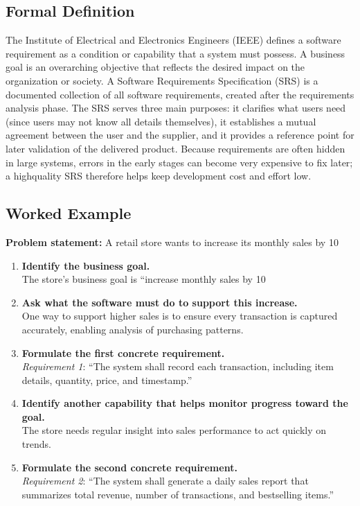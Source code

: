 \documentclass[12pt, a4paper]{article}
\begin{document}
\subsection{Formal Definition}
The Institute of Electrical and Electronics Engineers (IEEE) defines a software requirement as a condition or capability that a system must possess. A business goal is an overarching objective that reflects the desired impact on the organization or society. A Software Requirements Specification (SRS) is a documented collection of all software requirements, created after the requirements analysis phase. The SRS serves three main purposes: it clarifies what users need (since users may not know all details themselves), it establishes a mutual agreement between the user and the supplier, and it provides a reference point for later validation of the delivered product. Because requirements are often hidden in large systems, errors in the early stages can become very expensive to fix later; a highquality SRS therefore helps keep development cost and effort low.

\subsection{Worked Example}
\textbf{Problem statement:} A retail store wants to increase its monthly sales by 10 %

\begin{enumerate}
    \item \textbf{Identify the business goal.}\\
    The store's business goal is ``increase monthly sales by 10 %
    \item \textbf{Ask what the software must do to support this increase.}\\
    One way to support higher sales is to ensure every transaction is captured accurately, enabling analysis of purchasing patterns.
    \item \textbf{Formulate the first concrete requirement.}\\
    \emph{Requirement 1}: ``The system shall record each transaction, including item details, quantity, price, and timestamp.''
    \item \textbf{Identify another capability that helps monitor progress toward the goal.}\\
    The store needs regular insight into sales performance to act quickly on trends.
    \item \textbf{Formulate the second concrete requirement.}\\
    \emph{Requirement 2}: ``The system shall generate a daily sales report that summarizes total revenue, number of transactions, and bestselling items.''
\end{enumerate}
\end{document}
